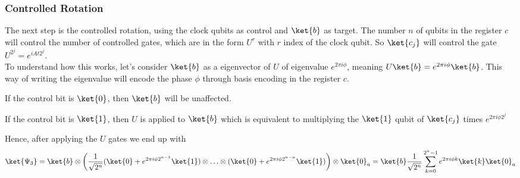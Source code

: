 \documentclass[10pt]{article}
\begin{document}
\subsubsection{Controlled Rotation}
The next step is the controlled rotation, using the clock qubits as control and $\ket{b}$ as target. The number $n$ of qubits in the register $c$ will control the number of controlled gates, which are in the form $U^r$ with $r$ index of the clock qubit. So $\ket{c_j}$ will control the gate $U^{2^j}=e^{iAt2^j}$.\\
To understand how this works, let's consider $\ket{b}$ as a eigenvector of $U$ of eigenvalue $e^{2\pi i\phi}$, meaning $U\ket{b}=e^{2\pi i\phi}\ket{b}$.
This way of writing the eigenvalue will encode the phase $\phi$ through basis encoding in the register $c$.
\begin{list}{}{}
	\item If the control bit is $\ket{0}$, then $\ket{b}$ will be unaffected.
	\item If the control bit is $\ket{1}$, then $U$ is applied to $\ket{b}$ which is equivalent to multiplying the $\ket{1}$ qubit of $\ket{c_j}$ times $e^{2\pi i\phi2^j}$
\end{list}
Hence, after applying the $U$ gates we end up with
$$\ket{\Psi_3} = \ket{b}\otimes\left(\frac{1}{\sqrt{2^n}}(\ket{0}+e^{2\pi i\phi 2^{n-1}}\ket{1})\otimes \ldots \otimes (\ket{0}+e^{2\pi i\phi 2^{n-n}}\ket{1})\right)\otimes \ket{0}_a =\ket{b}\frac{1}{\sqrt{2^n}}\sum_{k=0}^{2^n-1}e^{2\pi i\phi k}\ket{k}\ket{0}_a$$
\end{document}
